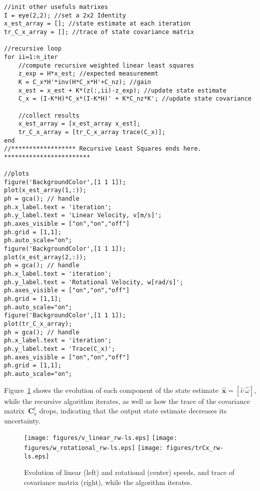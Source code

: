 \begin{mdframed}
\begin{verbatim}
//init other usefuls matrixes
I = eye(2,2); //set a 2x2 Identity
x_est_array = []; //state estimate at each iteration
tr_C_x_array = []; //trace of state covariance matrix

//recursive loop
for ii=1:n_iter
    //compute recursive weighted linear least squares
    z_exp = H*x_est; //expected measurememt
    K = C_x*H'*inv(H*C_x*H'+C_nz); //gain
    x_est = x_est + K*(z(:,ii)-z_exp); //update state estimate
    C_x = (I-K*H)*C_x*(I-K*H)' + K*C_nz*K'; //update state covariance
    
    //collect results
    x_est_array = [x_est_array x_est]; 
    tr_C_x_array = [tr_C_x_array trace(C_x)];
end
//****************** Recursive Least Squares ends here. ************************

//plots
figure('BackgroundColor',[1 1 1]);
plot(x_est_array(1,:));
ph = gca(); // handle
ph.x_label.text = 'iteration';
ph.y_label.text = 'Linear Velocity, v[m/s]';
ph.axes_visible = ["on","on","off"]
ph.grid = [1,1];
ph.auto_scale="on";
figure('BackgroundColor',[1 1 1]);
plot(x_est_array(2,:));
ph = gca(); // handle
ph.x_label.text = 'iteration';
ph.y_label.text = 'Rotational Velocity, w[rad/s]';
ph.axes_visible = ["on","on","off"]
ph.grid = [1,1];
ph.auto_scale="on";
figure('BackgroundColor',[1 1 1]);
plot(tr_C_x_array);
ph = gca(); // handle
ph.x_label.text = 'iteration';
ph.y_label.text = 'Trace(C_x)';
ph.axes_visible = ["on","on","off"]
ph.grid = [1,1];
ph.auto_scale="on";
\end{verbatim} 
\end{mdframed}

Figure~\ref{fig:vw_plot_rw-ls} shows the evolution of each component of the state estimate~$\hat{\mathbf{x}}=[\hat{v}\ \hat{\omega}]$, while the recursive algorithm iterates, as well as how the trace of the covariance matrix~$\mathbf{C}^t_x$ drops, indicating that the output state estimate decreases its uncertainty. 
\begin{figure}[h!]
  \centering
  \texttt{[image: figures/v\_linear\_rw-ls.eps]}
  \hspace{0mm}
  \texttt{[image: figures/w\_rotational\_rw-ls.eps]}
  \hspace{0mm}
  \texttt{[image: figures/trCx\_rw-ls.eps]}
  \hspace{0mm}
  \caption{Evolution of linear (left) and rotational (center) speeds, and trace of covariance matrix (right), while the algorithm iterates.}
  \label{fig:vw_plot_rw-ls}
\end{figure}



